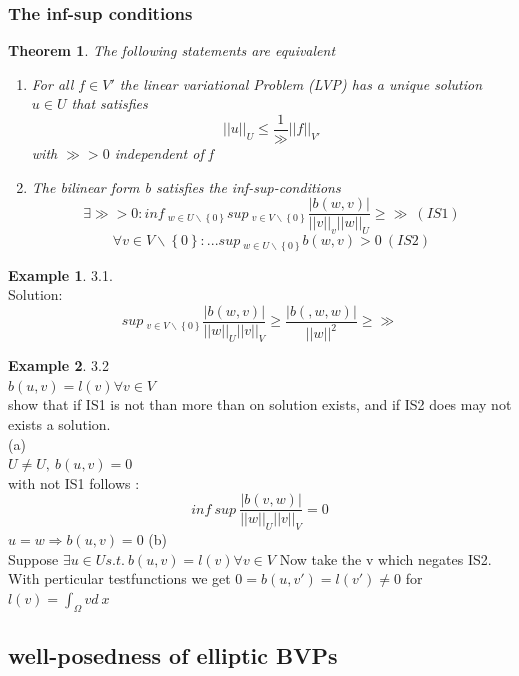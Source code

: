 \documentclass[english]{article}
\newtheorem*{theorem}{Theorem}
\theoremstyle{definition}
\newtheorem*{exa}{Example}
\theoremstyle{remark}
\newcommand{\f}[2]{\frac{#1}{#2}}							%
\newcommand{\OO}{\Omega}
\newcommand{\drw}{\Rightarrow}			%
\begin{document}
\subsubsection{ The inf-sup conditions }
\begin{theorem}
  The following statements are equivalent
  \begin{enumerate}
  \item For all $f \in V'$ the linear variational Problem (LVP) has a unique solution $u \in U$ that satisfies 
    $$||u||_U \leq \f{1}{\gg}||f||_{V'}$$
    with $\gg>0$ independent of f\\
  \item The bilinear form b satisfies the \emph{inf-sup-conditions}
    $$\exists \gg >0: inf\ _{w \in U \backslash\left\{0\right\} } sup\ _{v \in V \backslash \left\{0\right\}} \f{|b(w,v)|}{||v||_v||w||_U} \geq \gg \ (IS1)$$
    $$\forall v \in V \backslash\left\{0\right\} : ... sup\ _{w \in U \backslash\left\{0\right\}} b(w,v)>0 \ (IS2)$$
  \end{enumerate}
\end{theorem}

\begin{exa}
  3.1.\\
  Solution:\\
  $$sup\ _{v \in V \backslash\left\{0\right\}} \f{|b(w,v)|}{||w||_U ||v||_V} \geq \f{|b(,w,w)|}{||w||^2}\geq \gg$$
\end{exa}
\begin{exa}3.2\\
  $b(u,v) = l(v) \forall v \in V$\\
  show that if IS1 is not than more than on solution exists, and if IS2 does may not exists a solution.\\
  (a)\\
  $U\neq U, \ b(u,v) =0$ \\
  with not IS1 follows : $$inf\ sup\ \f{|b(v,w)|}{||w||_U||v||_V} =0$$
  $u=w \drw b(u,v) = 0$
  (b)\\
  Suppose $\exists u \in U s.t.\ b(u,v) = l(v) \forall v \in V$ Now take the v which negates IS2.\\
  With perticular testfunctions we get $0= b(u,v') =l(v')\neq 0$ for $l(v) = \int_\OO v d\ x$
\end{exa}
\subsection{well-posedness of elliptic BVPs}
\end{document}
